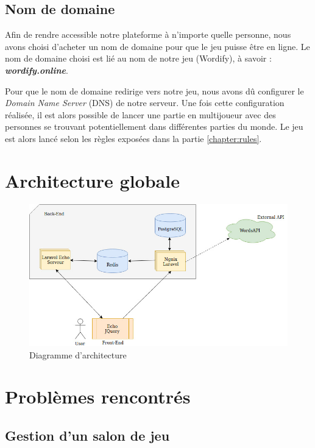 \documentclass{tnreport}
\begin{document}
\subsection{Nom de domaine}

Afin de rendre accessible notre plateforme à n'importe quelle personne, nous avons choisi d'acheter un nom de domaine pour que le jeu puisse être en ligne. Le nom de domaine choisi est lié au nom de notre jeu (Wordify), à savoir : \textbf{\textit{wordify.online}}.

Pour que le nom de domaine redirige vers notre jeu, nous avons dû configurer le \textit{Domain Name Server} (DNS) de notre serveur. Une fois cette configuration réalisée, il est alors possible de lancer une partie en multijoueur avec des personnes se trouvant potentiellement dans différentes parties du monde. Le jeu est alors lancé selon les règles exposées dans la partie \ref{chapter:rules}. 

\section{Architecture globale}

\label{chapter:global_architecture}

\begin{figure}[ht]
	\centering
	\fboxsep=1.2pt
	\includegraphics[scale=0.6]{figures/diagram}
	\caption{Diagramme d'architecture}
	\label{fig:achitecture_diagram}
\end{figure} 

\section{Problèmes rencontrés}

\subsection{Gestion d'un salon de jeu}
\end{document}
